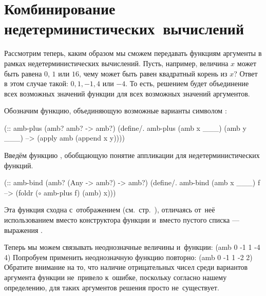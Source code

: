 \section[4]{Комбинирование недетерминистических~вычислений}%
Рассмотрим теперь, каким образом мы сможем передавать функциям аргументы в рамках недетерминистических вычислений. Пусть, например, величина $x$ может быть равена $0$, $1$ или $16$, чему может быть равен квадратный корень из $x$? Ответ в этом случае такой: $0, 1, -1, 4$ или $-4$. То есть, решением будет объединение всех возможных значений функции для всех возможных значений аргументов.

Обозначим функцию, объединяющую возможные варианты символом :
\begin{Definition}[emph={x,f}]
(:: amb-plus (amb? amb? -> amb?)
  (define/. amb-plus
    (amb x ___) (amb y ___) --> (apply amb (append x y))))
\end{Definition}

Введём функцию , обобщающую понятие аппликации для недетерминистических функций.
\begin{Definition}[emph={x,f}]
(:: amb-bind (amb? (Any -> amb?) -> amb?)
  (define/. amb-bind
    (amb x ___) f --> (foldr ($\circ$ amb-plus f) (amb) x)))
\end{Definition}
Эта функция сходна с~отображением  (см.~стр.~\pageref{fold:map}), отличаясь от~неё использованием вместо конструктора  функции  и~вместо пустого списка --- выражения .

Теперь мы можем связывать неоднозначные величины и~функции:
     {(amb 0 -1 1 -4 4)}
Попробуем применить неоднозначную функцию  повторно:
     {(amb 0 -1 1 -2 2)}
Обратите внимание на то, что наличие отрицательных чисел среди вариантов аргумента функции  не~привело к~ошибке, поскольку согласно нашему определению, для таких аргументов решения просто не~существует.

